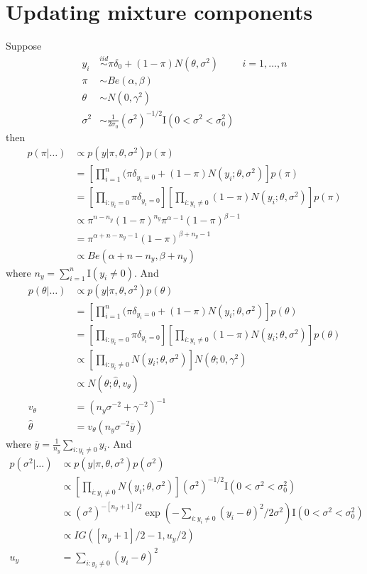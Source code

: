 \documentclass{article}
\begin{document}
\section{Updating mixture components}

Suppose 
\begin{align*} 
y_i &\stackrel{iid}{\sim} \pi \delta_0 + (1-\pi) N(\theta,\sigma^2) &i=1,\ldots,n \\
\pi &\sim Be(\alpha,\beta) \\
\theta &\sim N(0,\gamma^2) \\
\sigma^2 &\sim \frac{1}{2\sigma_0} (\sigma^2)^{-1/2} \mathrm{I}(0<\sigma^2<\sigma_0^2) 
\end{align*}
then
\begin{align*}
p(\pi|\ldots) &\propto p(y|\pi,\theta,\sigma^2) p(\pi) \\
&= \left[ \prod_{i=1}^n (\pi \delta_{y_i=0} + (1-\pi) N(y_i;\theta,\sigma^2) \right] p(\pi) \\
&= \left[ \prod_{i:y_i=0} \pi \delta_{y_i=0} \right] \left[ \prod_{i:y_i\ne 0} (1-\pi) N(y_i;\theta,\sigma^2) \right] p(\pi) \\
&\propto \pi^{n-n_y}(1-\pi)^{n_y} \pi^{\alpha-1}(1-\pi)^{\beta-1} \\
&= \pi^{\alpha+n-n_y-1}(1-\pi)^{\beta+n_y-1} \\
&\propto Be(\alpha+n-n_y,\beta+n_y) 
\end{align*}
where $n_y = \sum_{i=1}^n \mathrm{I}(y_i\ne 0)$. And  
\begin{align*}
p(\theta|\ldots) &\propto p(y|\pi,\theta,\sigma^2) p(\theta) \\
&= \left[ \prod_{i=1}^n (\pi \delta_{y_i=0} + (1-\pi) N(y_i;\theta,\sigma^2) \right] p(\theta) \\
&= \left[ \prod_{i:y_i=0} \pi \delta_{y_i=0} \right] \left[ \prod_{i:y_i\ne 0} (1-\pi) N(y_i;\theta,\sigma^2) \right] p(\theta) \\
&\propto \left[ \prod_{i:y_i\ne 0} N(y_i;\theta,\sigma^2) \right] N(\theta;0,\gamma^2) \\
&\propto N(\theta; \hat{\theta}, v_\theta) \\
v_\theta &= (n_y \sigma^{-2} + \gamma^{-2})^{-1} \\
\hat{\theta} &= v_\theta (n_y \sigma^{-2} \overline{y})
\end{align*}
where $\overline{y} = \frac{1}{n_y} \sum_{i:y_i\ne 0} y_i$. And
\begin{align*}
p(\sigma^2|\ldots) &\propto p(y|\pi,\theta,\sigma^2) p(\sigma^2) \\
&\propto \left[ \prod_{i:y_i\ne 0} N(y_i;\theta,\sigma^2) \right] (\sigma^2)^{-1/2} \mathrm{I}(0<\sigma^2<\sigma_0^2) \\
&\propto (\sigma^2)^{-[n_y+1]/2} \exp\left(-\sum_{i:y_i\ne 0} (y_i-\theta)^2/2\sigma^2\right)\mathrm{I}(0<\sigma^2<\sigma_0^2) \\
&\propto IG([n_y+1]/2-1, u_y/2) \\
u_y &=  \sum_{i:y_i\ne 0} (y_i-\theta)^2
\end{align*}
\end{document}
